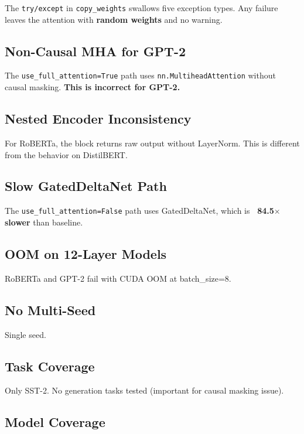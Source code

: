 The \texttt{try/except} in \texttt{copy\_weights} swallows five exception types. Any 
failure leaves the attention with \textbf{random weights} and no warning.

\subsection{Non-Causal MHA for GPT-2}

The \texttt{use\_full\_attention=True} path uses \texttt{nn.MultiheadAttention} without 
causal masking. \textbf{This is incorrect for GPT-2.}

\subsection{Nested Encoder Inconsistency}

For RoBERTa, the block returns raw output without LayerNorm. This is 
different from the behavior on DistilBERT.

\subsection{Slow GatedDeltaNet Path}

The \texttt{use\_full\_attention=False} path uses GatedDeltaNet, which is 
\textbf{~84.5$\times$ slower} than baseline.

\subsection{OOM on 12-Layer Models}

RoBERTa and GPT-2 fail with CUDA OOM at batch\_size=8.

\subsection{No Multi-Seed}

Single seed.

\subsection{Task Coverage}

Only SST-2. No generation tasks tested (important for causal masking issue).

\subsection{Model Coverage}

